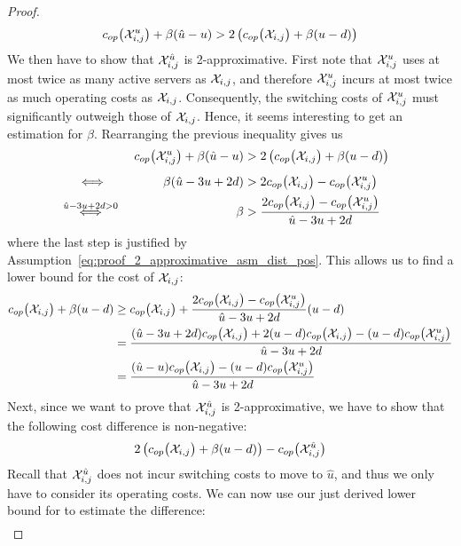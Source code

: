\begin{proof}
\begin{equation*}
	c_{op}\bigl(\mathcal{X}_{i,j}^u\bigr)+\beta(\hat{u}-u)>2\left(c_{op}\bigl(\mathcal{X}_{i,j}\bigr)+\beta(u-d)\right)
\end{equation*}
We then have to show that $\mathcal{X}_{i,j}^{\hat{u}}$ is 2-approximative.
First note that $\mathcal{X}_{i,j}^u$ uses at most twice as many active servers as $\mathcal{X}_{i,j}$, and therefore $\mathcal{X}_{i,j}^u$ incurs at most twice as much operating costs as $\mathcal{X}_{i,j}$. Consequently, the switching costs of $\mathcal{X}_{i,j}^u$ must significantly outweigh those of $\mathcal{X}_{i,j}$. Hence, it seems interesting to get an estimation for $\beta$. Rearranging the previous inequality gives us
\begin{align*}
	&&\opcosts\bigl(\mx_{i,j}^u\bigr)+\beta(\hat{u}-u)&>2\left(\opcosts\bigl(\mx_{i,j}\bigr)+\beta(u-d)\right)&\\
	&\stackrel{\phantom{\hat{u}-3u+2d)>0}}{\iff}&\beta(\hat{u}-3u+2d)&>2\opcosts\bigl(\mx_{i,j}\bigr)-\opcosts\bigl(\mx_{i,j}^u\bigr)&\\
	&\stackrel{\hat{u}-3u+2d>0}{\iff}&\beta&>\frac{2\opcosts\bigl(\mx_{i,j}\bigr)-\opcosts\bigl(\mx_{i,j}^u\bigr)}{\hat{u}-3u+2d}
\end{align*}
where the last step is justified by Assumption~\eqref{eq:proof_2_approximative_asm_dist_pos}.
This allows us to find a lower bound for the cost of $\mathcal{X}_{i,j}$:
\begin{align*}
	c_{op}\bigl(\mathcal{X}_{i,j}\bigr)+\beta(u-d)&\ge c_{op}\bigl(\mathcal{X}_{i,j}\bigr)+\frac{2c_{op}\bigl(\mathcal{X}_{i,j}\bigr)-c_{op}\bigl(\mathcal{X}_{i,j}^u\bigr)}{\hat{u}-3u+2d}(u-d)\\
	&=\frac{(\hat{u}-3u+2d)c_{op}\bigl(\mathcal{X}_{i,j}\bigr)+2(u-d)c_{op}\bigl(\mathcal{X}_{i,j}\bigr)-(u-d)c_{op}\bigl(\mathcal{X}_{i,j}^u\bigr)}{\hat{u}-3u+2d}\\
	&=\frac{(\hat{u}-u)c_{op}\bigl(\mathcal{X}_{i,j}\bigr)-(u-d)c_{op}\bigl(\mathcal{X}_{i,j}^u\bigr)}{\hat{u}-3u+2d}
\end{align*}
Next, since we want to prove that $\mathcal{X}_{i,j}^{\hat{u}}$ is 2-approximative, we have to show that the following cost difference is non-negative:
\begin{align*}
	2\left(c_{op}\bigl(\mathcal{X}_{i,j}\bigr)+\beta(u-d)\right)-c_{op}\bigl(\mathcal{X}_{i,j}^{\hat{u}}\bigr)
\end{align*}
Recall that $\mathcal{X}_{i,j}^{\hat{u}}$ does not incur switching costs to move to $\hat{u}$, and thus we only have to consider its operating costs.
We can now use our just derived lower bound for  to estimate the difference:
\begin{align*}

\end{align*}
\end{proof}
